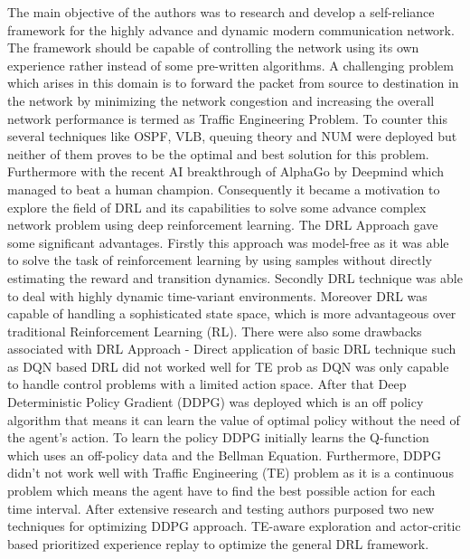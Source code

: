 The main objective of the authors was to research and develop a self-reliance framework for the highly advance and dynamic modern communication network. The framework should be capable of controlling the network using its own experience rather instead of some pre-written algorithms. A challenging problem which arises in this domain is to forward the packet from source to destination in the network by  minimizing the network congestion and increasing the overall network performance is termed as Traffic Engineering Problem. To counter this several techniques like OSPF, VLB, queuing theory and NUM were deployed but neither of them proves to be the optimal and best solution for this problem. Furthermore with the recent AI breakthrough of AlphaGo by Deepmind which managed to beat a human champion. Consequently it became a motivation to explore the field of DRL and its capabilities to solve some advance complex network problem using deep reinforcement learning.
The DRL \cite{mnih2015humanlevel} Approach gave some significant advantages. Firstly this approach was model-free as it was able to solve the task of reinforcement learning by using samples without directly estimating the reward and transition dynamics.
Secondly DRL technique was able to deal with highly dynamic time-variant environments.
Moreover DRL was capable of handling a sophisticated state space, which is more advantageous over traditional Reinforcement Learning (RL).
There were also some drawbacks associated with DRL Approach - Direct application of basic DRL technique such as DQN \cite{mnih2015humanlevel} based DRL did not worked well for TE prob as DQN was only capable to handle control problems with a limited action space. After that Deep Deterministic Policy Gradient (DDPG) \cite{pmlr-v32-silver14} was deployed which is an off policy algorithm that means it can learn the value of optimal policy without the need of the agent's action.
To learn the policy DDPG initially learns the Q-function which uses an off-policy data and the Bellman Equation. Furthermore, DDPG didn't not work well with Traffic Engineering (TE) problem as it is a continuous problem which means the agent have to find the best possible action for each time interval.
After extensive research and testing authors purposed two new techniques for optimizing DDPG approach. TE-aware exploration and actor-critic based prioritized experience replay to optimize the general DRL framework.


